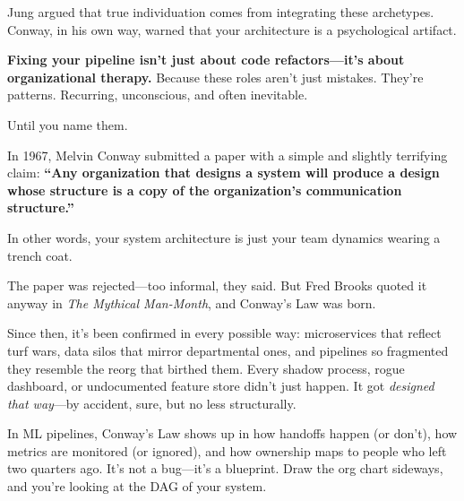 Jung argued that true individuation comes from integrating these archetypes. Conway, in his own way, warned that your architecture is a psychological artifact.

\textbf{Fixing your pipeline isn’t just about code refactors—it’s about organizational therapy.} Because these roles aren’t just mistakes. They’re patterns. Recurring, unconscious, and often inevitable.

Until you name them.


\begin{tcolorbox}[
    title=Sidebar: Conway’s Law — The Org Chart as Source Code,
    colback=gray!5,
    colframe=black,
    fonttitle=\bfseries,
    sharp corners=south,
    boxrule=0.5pt,
    enhanced,
    breakable
  ]
  In 1967, Melvin Conway submitted a paper with a simple and slightly terrifying claim: \textbf{“Any organization that designs a system will produce a design whose structure is a copy of the organization’s communication structure.”}
  
  In other words, your system architecture is just your team dynamics wearing a trench coat.
  
  The paper was rejected—too informal, they said. But Fred Brooks quoted it anyway in \textit{The Mythical Man-Month}, and Conway’s Law was born.
  
  Since then, it’s been confirmed in every possible way: microservices that reflect turf wars, data silos that mirror departmental ones, and pipelines so fragmented they resemble the reorg that birthed them. Every shadow process, rogue dashboard, or undocumented feature store didn’t just happen. It got \textit{designed that way}—by accident, sure, but no less structurally.
  
  In ML pipelines, Conway’s Law shows up in how handoffs happen (or don’t), how metrics are monitored (or ignored), and how ownership maps to people who left two quarters ago. It’s not a bug—it’s a blueprint. Draw the org chart sideways, and you’re looking at the DAG of your system.
\end{tcolorbox}

